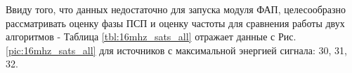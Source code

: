 Ввиду того, что данных недостаточно для запуска модуля ФАП, целесообразно рассматривать оценку фазы ПСП и оценку частоты для сравнения работы двух
алгоритмов - Таблица \ref{tbl:16mhz_sats_all} отражает данные с Рис. \ref{pic:16mhz_sats_all} для источников с максимальной энергией сигнала: 30, 31, 32.
